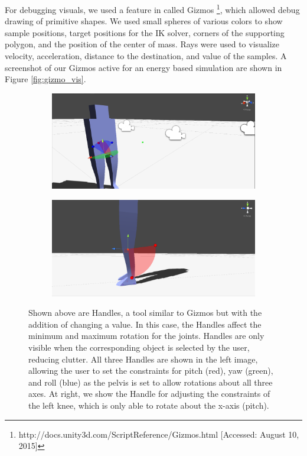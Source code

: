For debugging visuals, we used a feature in \unity{} called Gizmos \footnote{http://docs.unity3d.com/ScriptReference/Gizmos.html [Accessed: August 10, 2015]}, which allowed debug drawing of primitive shapes.  We used small spheres of various colors to show sample positions, target positions for the IK solver, corners of the supporting polygon, and the position of the center of mass.  Rays were used to visualize velocity, acceleration, distance to the destination, and value of the samples.  A screenshot of our Gizmos active for an energy based simulation are shown in Figure \ref{fig:gizmo_vis}.

\begin{figure}[ht]
	\centering
	\begin{subfigure}[b]{0.49\textwidth}
		\includegraphics[width=\textwidth]{images/handles1.png}
	\end{subfigure}
	\begin{subfigure}[b]{0.49\textwidth}
		\includegraphics[width=\textwidth]{images/handles2.png}
	\end{subfigure}
	\caption[Screenshot of Handles used for setting and visualizing joint constraints in \unity{}]{Shown above are Handles, a tool similar to Gizmos but with the addition of changing a value.  In this case, the Handles affect the minimum and maximum rotation for the joints.  Handles are only visible when the corresponding object is selected by the user, reducing clutter.  All three Handles are shown in the left image, allowing the user to set the constraints for pitch (red), yaw (green), and roll (blue) as the pelvis is set to allow rotations about all three axes.  At right, we show the Handle for adjusting the constraints of the left knee, which is only able to rotate about the x-axis (pitch).}
	\label{fig:handle_vis}
\end{figure}

